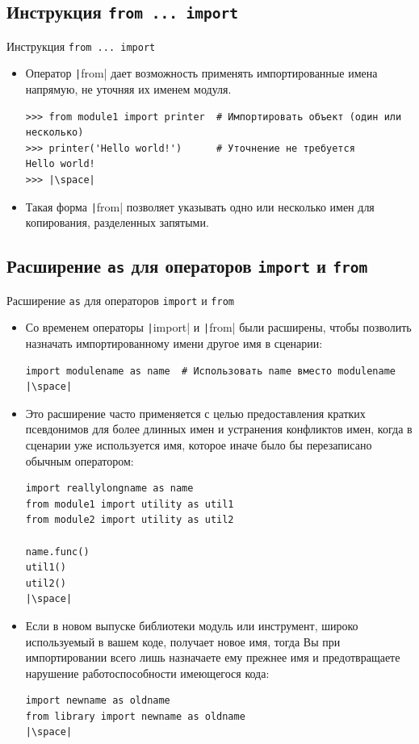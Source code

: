 \documentclass[aspectratio=169, mathserif]{beamer}	%
\begin{document}
\subsection{Инструкция \texttt{from ... import}}
\begin{frame}[fragile]{Инструкция \texttt{from ... import}}
\scriptsize
\begin{itemize}
	\item Оператор \texttt|from| дает возможность применять импортированные имена напрямую, не уточняя их именем модуля.
\vfill
\begin{verbatim}
>>> from module1 import printer  # Импортировать объект (один или несколько)
>>> printer('Hello world!')      # Уточнение не требуется
Hello world!
>>> |\space|
\end{verbatim}
\vfill
\item Такая форма  \texttt|from| позволяет указывать одно или несколько имен для копирования, разделенных запятыми.
\end{itemize}
\vfill
\end{frame}

\subsection{Расширение \texttt{as} для операторов \texttt{import} и \texttt{from}}
\begin{frame}[fragile]{Расширение \texttt{as} для операторов \texttt{import} и \texttt{from}}
\scriptsize
\begin{itemize}
	\item Со временем операторы \texttt|import| и \texttt|from| были расширены, чтобы позволить назначать импортированному имени другое имя в сценарии:
\vfill
\begin{verbatim}
import modulename as name  # Использовать name вместо modulename
|\space|
\end{verbatim}
\vfill
\item Это расширение часто применяется с целью предоставления кратких псевдонимов для более длинных имен и устранения конфликтов имен, когда в сценарии уже используется имя, которое иначе было бы перезаписано обычным оператором:
\begin{verbatim}
import reallylongname as name
from module1 import utility as util1
from module2 import utility as util2

name.func()
util1()
util2()
|\space|
\end{verbatim}
\item Если в новом выпуске библиотеки модуль или инструмент, широко используемый в вашем коде, получает новое имя, тогда Вы при импортировании всего лишь назначаете ему прежнее имя и предотвращаете нарушение работоспособности имеющегося кода:
\vfill
\begin{verbatim}
import newname as oldname
from library import newname as oldname
|\space|
\end{verbatim}
\end{itemize}
\vfill
\end{frame}
\end{document}
